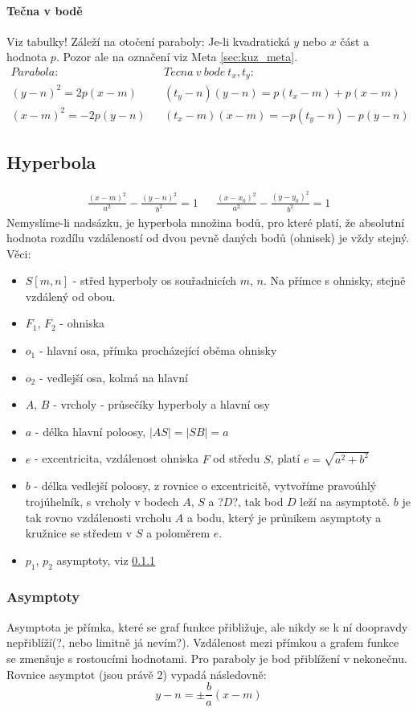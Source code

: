 \documentclass[12pt]{article}
\begin{document}
\paragraph{Tečna v bodě}
Viz tabulky! Záleží na otočení paraboly:  Je-li kvadratická $y$ nebo $x$ část a hodnota $p$. Pozor ale na označení viz Meta \ref{sec:kuz_meta}.
\begin{align}
Parabola:&& Tecna~v~bode~t_x , t_y:\\
(y-n)^2 = 2p(x-m) && (t_y -n)(y-n) = p (t_x-m) + p(x-m)\\
(x-m)^2 = -2p(y-n) && (t_x - m)(x-m) = -p(t_y -n) - p(y-n)
\end{align}

\subsection{Hyperbola}
\begin{align}
\frac{(x-m)^2}{a^2} - \frac{(y-n)^2}{b^2} = 1 && \frac{(x-x_0)^2}{a^2} - \frac{(y-y_0)^2}{b^2} = 1
\end{align}
Nemyslíme-li nadsázku, je hyperbola množina bodů, pro které platí, že absolutní hodnota rozdílu vzdáleností od dvou pevně daných bodů (ohnisek) je vždy stejný. Věci:
\begin{itemize}
\item $S[m,n]$ - střed hyperboly os souřadnicích $m$, $n$. Na přímce s ohnisky, stejně vzdálený od obou.
\item $F_1$, $F_2$ - ohniska
\item $o_1$ - hlavní osa, přímka procházející oběma ohnisky
\item $o_2$ - vedlejší osa, kolmá na hlavní
\item $A$, $B$  - vrcholy - průsečíky hyperboly a hlavní osy
\item $a$ - délka hlavní poloosy, $|AS| = |SB| = a$
\item $e$ - excentricita, vzdálenost ohniska $F$ od středu $S$, platí $e =\sqrt{a^2 + b^2}$
\item $b$ - délka vedlejší poloosy, z rovnice o excentricitě, vytvoříme pravoúhlý trojúhelník, s vrcholy v bodech $A$, $S$ a ?$D$?, tak bod $D$ leží na asymptotě. $b$ je tak rovno vzdálenosti vrcholu $A$ a bodu, který je průnikem asymptoty a kružnice se středem v $S$ a poloměrem $e$.
\item $p_1$, $p_2$ asymptoty, viz \ref{sec:hyp_asymptoty}
\end{itemize}

\subsubsection{Asymptoty}
\label{sec:hyp_asymptoty}
Asymptota je přímka, které se graf funkce přibližuje, ale nikdy se k ní doopravdy nepřiblíží(?, nebo limitně já nevím?). Vzdálenost mezi přímkou a grafem funkce se zmenšuje s rostoucími hodnotami. Pro paraboly je bod přiblížení v nekonečnu. Rovnice asymptot (jsou právě 2) vypadá následovně:
\begin{equation}
y - n = \pm \frac{b}{a}(x-m)
\end{equation}
\end{document}
